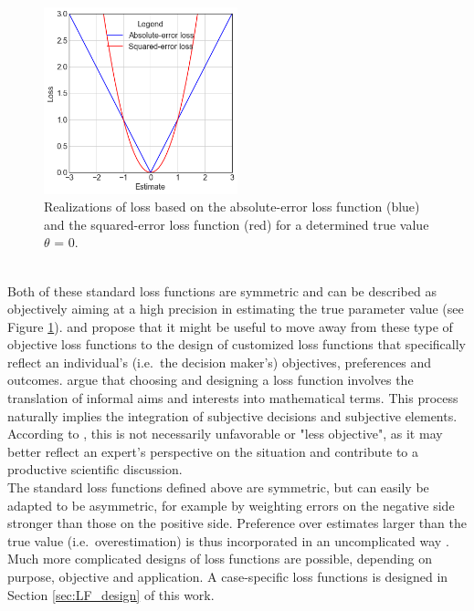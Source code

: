         \begin{figure}[h]
        	\centering
        	\includegraphics[width=0.5\textwidth]{Figures/abs_sqr_det.png}
        	\caption{Realizations of loss based on the absolute-error loss function (blue) and the squared-error loss function (red) for a determined true value $\theta$ = 0.}\label{fig:abs_sqr_det} 
        \end{figure}\\
        Both of these standard loss functions are symmetric and can be described as objectively aiming at a high precision in estimating the true parameter value (see Figure \ref{fig:abs_sqr_det}).
        \citet{davidson2015} and \citet{hennig2007} propose that it might be useful to move away from these type of objective loss functions to the design of customized loss functions that specifically reflect an individual's (i.e.\ the decision maker's) objectives, preferences and outcomes. \citet{hennig2007} argue that choosing and designing a loss function involves the translation of informal aims and interests into mathematical terms. This process naturally implies the integration of subjective decisions and subjective elements. According to \citet{hennig2007}, this is not necessarily unfavorable or "less objective", as it may better reflect an expert's perspective on the situation and contribute to a productive scientific discussion.\\        
        The standard loss functions defined above are symmetric, but can easily be adapted to be asymmetric, for example by weighting errors on the negative side stronger than those on the positive side. Preference over estimates larger than the true value (i.e.\ overestimation) is thus incorporated in an uncomplicated way \citep{davidson2015, hennig2007}. Much more complicated designs of loss functions are possible, depending on purpose, objective and application. A case-specific loss functions is designed in Section \ref{sec:LF_design} of this work.\\
